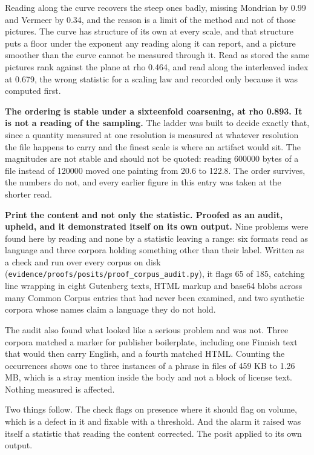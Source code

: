 Reading along the curve recovers the steep ones badly, missing Mondrian by 0.99 and Vermeer by 0.34, and the reason is a limit of the method and not of those pictures. The curve has structure of its own at every scale, and that structure puts a floor under the exponent any reading along it can report, and a picture smoother than the curve cannot be measured through it. Read as stored the same pictures rank against the plane at rho 0.464, and read along the interleaved index at 0.679, the wrong statistic for a scaling law and recorded only because it was computed first.

\textbf{The ordering is stable under a sixteenfold coarsening, at rho 0.893. It is not a reading of the sampling.} The ladder was built to decide exactly that, since a quantity measured at one resolution is measured at whatever resolution the file happens to carry and the finest scale is where an artifact would sit. The magnitudes are not stable and should not be quoted: reading 600000 bytes of a file instead of 120000 moved one painting from 20.6 to 122.8. The order survives, the numbers do not, and every earlier figure in this entry was taken at the shorter read.

\textbf{Print the content and not only the statistic. Proofed as an audit, upheld, and it demonstrated itself on its own output.} Nine problems were found here by reading and none by a statistic leaving a range: six formats read as language and three corpora holding something other than their label. Written as a check and run over every corpus on disk (\texttt{evidence/\allowbreak{}proofs/\allowbreak{}posits/\allowbreak{}proof\_\allowbreak{}corpus\_\allowbreak{}audit.\allowbreak{}py}), it flags 65 of 185, catching line wrapping in eight Gutenberg texts, HTML markup and base64 blobs across many Common Corpus entries that had never been examined, and two synthetic corpora whose names claim a language they do not hold.

The audit also found what looked like a serious problem and was not. Three corpora matched a marker for publisher boilerplate, including one Finnish text that would then carry English, and a fourth matched HTML. Counting the occurrences shows one to three instances of a phrase in files of 459 KB to 1.26 MB, which is a stray mention inside the body and not a block of license text. Nothing measured is affected.

Two things follow. The check flags on presence where it should flag on volume, which is a defect in it and fixable with a threshold. And the alarm it raised was itself a statistic that reading the content corrected. The posit applied to its own output.

